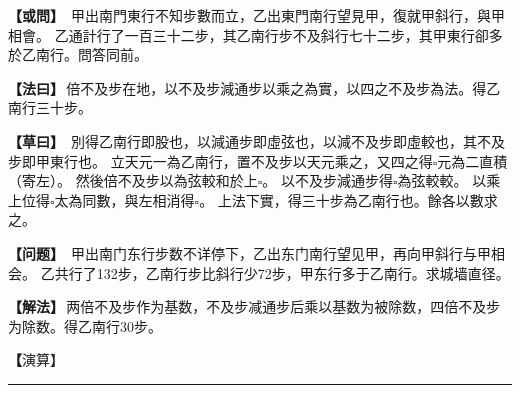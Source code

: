 \documentclass[11pt,a4paper]{article}
\let\origsquare\square
\renewcommand{\square}{\ensuremath{\origsquare}}%
\newcommand{\longline}{\noindent\rule{\textwidth}{0.4pt}}
\newcommand{\clOWEN}[1]{%
  \par\vspace{0.3em}%
  \noindent\textcolor{problemcolor}{\textbf{【或問】}}\,{\tradfont #1}\par\nopagebreak%
}
\newcommand{\mdOWEN}[1]{%
  \par\vspace{0.3em}%
  \noindent\textcolor{problemcolor}{\textbf{【问题】}}\,{\modfont #1}\par\nopagebreak%
}
\newcommand{\clFAYUE}[1]{%
  \par\noindent\textcolor{methodcolor}{\textbf{【法曰】}}\,{\tradfont #1}\par\nopagebreak%
}
\newcommand{\mdFAYUE}[1]{%
  \par\noindent\textcolor{methodcolor}{\textbf{【解法】}}\,{\modfont #1}\par\nopagebreak%
}
\newcommand{\clTSAOYUE}[1]{%
  \par\noindent\textcolor{workcolor}{\textbf{【草曰】}}\,{\tradfont #1}\par%
}
\newcommand{\mdTSAOYUE}[1]{%
  \par\noindent\textcolor{workcolor}{\textbf【演算】}}\,{\modfont #1}\par%
\begin{document}
\begin{paracol}{2}

\begin{leftcolumn}
\clOWEN{%
甲出南門東行不知步數而立，乙出東門南行望見甲，復就甲斜行，與甲相會。
乙通計行了一百三十二步，其乙南行步不及斜行七十二步，其甲東行卻多於乙南行。問答同前。}

\clFAYUE{倍不及步在地，以不及步減通步以乘之為實，以四之不及步為法。得乙南行三十步。}

\clTSAOYUE{%
別得乙南行即股也，以減通步即虛弦也，以減不及步即虛較也，其不及步即甲東行也。
立天元一為乙南行，置不及步以天元乘之，又四之得$\square$元為二直積（寄左）。
然後倍不及步以為弦較和於上$\square$。
以不及步減通步得$\square$為弦較較。
以乘上位得$\square$太為同數，與左相消得$\square$。
上法下實，得三十步為乙南行也。餘各以數求之。}
\end{leftcolumn}

\switchcolumn

\begin{rightcolumn}
\mdOWEN{%
甲出南门东行步数不详停下，乙出东门南行望见甲，再向甲斜行与甲相会。
乙共行了132步，乙南行步比斜行少72步，甲东行多于乙南行。求城墙直径。}

\mdFAYUE{两倍不及步作为基数，不及步减通步后乘以基数为被除数，四倍不及步为除数。得乙南行30步。}

\mdTSAOYUE{%
辨识得：乙南行即为股，从通步中减去即为虚弦，减不及步即为虚较，不及步即甲东行。
设天元一为乙南行，取不及步以天元乘之，再四倍得$\square$元为两倍直积（寄左）。
然后两倍不及步作为弦较和于上位$\square$。
不及步减通步得$\square$为弦较较。
相乘得$\square$太为同数，与左式相消得$\square$。
上法下实，得30步为乙南行。其余各以数求之。}
\end{rightcolumn}

\end{paracol}

\vspace{0.3cm}
\begin{center}\longline\end{center}
\end{document}
